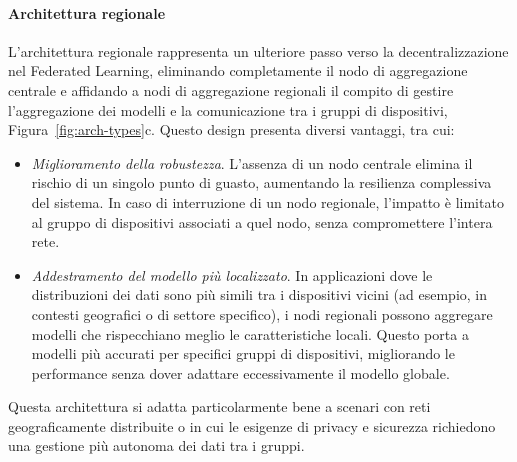 \documentclass[a4paper, oneside, openright]{report}
\begin{document}
\paragraph{Architettura regionale}
L'architettura regionale rappresenta un ulteriore passo verso la decentralizzazione nel Federated Learning, eliminando completamente il nodo di aggregazione centrale e affidando a nodi di aggregazione regionali il compito di gestire l'aggregazione dei modelli e la comunicazione tra i gruppi di dispositivi, Figura~\ref{fig:arch-types}c. Questo design presenta diversi vantaggi, tra cui:
\begin{itemize}
\item \textit{Miglioramento della robustezza}. L'assenza di un nodo centrale elimina il rischio di un singolo punto di guasto, aumentando la resilienza complessiva del sistema. In caso di interruzione di un nodo regionale, l’impatto è limitato al gruppo di dispositivi associati a quel nodo, senza compromettere l’intera rete.
\item \textit{Addestramento del modello più localizzato}. In applicazioni dove le distribuzioni dei dati sono più simili tra i dispositivi vicini (ad esempio, in contesti geografici o di settore specifico), i nodi regionali possono aggregare modelli che rispecchiano meglio le caratteristiche locali. Questo porta a modelli più accurati per specifici gruppi di dispositivi, migliorando le performance senza dover adattare eccessivamente il modello globale.
\end{itemize}

Questa architettura si adatta particolarmente bene a scenari con reti geograficamente distribuite o in cui le esigenze di privacy e sicurezza richiedono una gestione più autonoma dei dati tra i gruppi.
\end{document}
